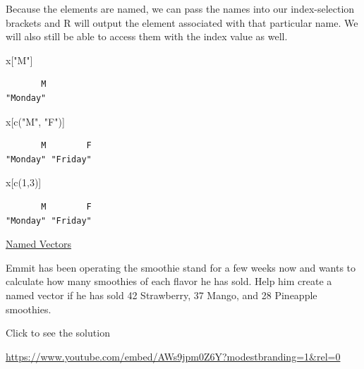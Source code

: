 \documentclass[
  letterpaper,
  DIV=11,
  numbers=noendperiod]{scrreprt}
\newenvironment{Shaded}{\begin{snugshade}}{\end{snugshade}}
\newcommand{\DecValTok}[1]{\textcolor[rgb]{0.68,0.00,0.00}{#1}}
\newcommand{\FunctionTok}[1]{\textcolor[rgb]{0.28,0.35,0.67}{#1}}
\newcommand{\NormalTok}[1]{\textcolor[rgb]{0.00,0.23,0.31}{#1}}
\newcommand{\StringTok}[1]{\textcolor[rgb]{0.13,0.47,0.30}{#1}}
\begin{document}
Because the elements are named, we can pass the names into our
index-selection brackets and R will output the element associated with
that particular name. We will also still be able to access them with the
index value as well.

\begin{Shaded}
\begin{Highlighting}[]
\NormalTok{x[}\StringTok{"M"}\NormalTok{]}
\end{Highlighting}
\end{Shaded}

\begin{verbatim}
       M 
"Monday" 
\end{verbatim}

\begin{Shaded}
\begin{Highlighting}[]
\NormalTok{x[}\FunctionTok{c}\NormalTok{(}\StringTok{"M"}\NormalTok{, }\StringTok{"F"}\NormalTok{)]}
\end{Highlighting}
\end{Shaded}

\begin{verbatim}
       M        F 
"Monday" "Friday" 
\end{verbatim}

\begin{Shaded}
\begin{Highlighting}[]
\NormalTok{x[}\FunctionTok{c}\NormalTok{(}\DecValTok{1}\NormalTok{,}\DecValTok{3}\NormalTok{)]}
\end{Highlighting}
\end{Shaded}

\begin{verbatim}
       M        F 
"Monday" "Friday" 
\end{verbatim}

\begin{watch}{}{}
    \href{https://youtu.be/uYHuPb60zSA}{Named Vectors}
\end{watch}

\begin{tcolorbox}[enhanced jigsaw, leftrule=.75mm, arc=.35mm, coltitle=black, rightrule=.15mm, bottomrule=.15mm, toprule=.15mm, left=2mm, colbacktitle=quarto-callout-tip-color!10!white, title=\textcolor{quarto-callout-tip-color}{\faLightbulb}\hspace{0.5em}{Try it Out}, toptitle=1mm, breakable, colframe=quarto-callout-tip-color-frame, bottomtitle=1mm, titlerule=0mm, colback=white, opacityback=0, opacitybacktitle=0.6]

Emmit has been operating the smoothie stand for a few weeks now and
wants to calculate how many smoothies of each flavor he has sold. Help
him create a named vector if he has sold 42 Strawberry, 37 Mango, and 28
Pineapple smoothies.

Click to see the solution

\url{https://www.youtube.com/embed/AWs9jpm0Z6Y?modestbranding=1&rel=0}

\end{tcolorbox}
\end{document}
